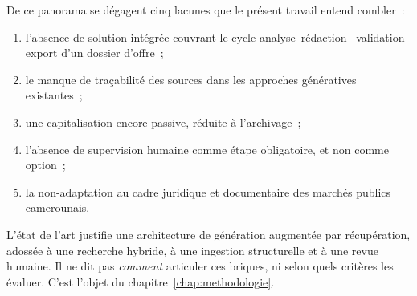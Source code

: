 De ce panorama se dégagent cinq lacunes que le présent travail entend
combler~:

\begin{enumerate}
  \item l'absence de solution intégrée couvrant le cycle analyse--rédaction
        --validation--export d'un dossier d'offre~;
  \item le manque de traçabilité des sources dans les approches génératives
        existantes~;
  \item une capitalisation encore passive, réduite à l'archivage~;
  \item l'absence de supervision humaine comme étape obligatoire, et non
        comme option~;
  \item la non-adaptation au cadre juridique et documentaire des marchés
        publics camerounais.
\end{enumerate}

\begin{btpbox}
L'état de l'art justifie une architecture de génération augmentée par
récupération, adossée à une recherche hybride, à une ingestion
structurelle et à une revue humaine. Il ne dit pas \emph{comment}
articuler ces briques, ni selon quels critères les évaluer. C'est l'objet
du chapitre~\ref{chap:methodologie}.
\end{btpbox}

\btpEndMark

